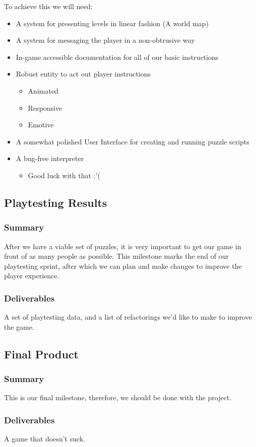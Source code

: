 To achieve this we will need:
\begin{itemize}
  \item A system for presenting levels in linear fashion (A world map)
  \item A system for messaging the player in a non-obtrusive way
  \item In-game accessible documentation for all of our basic instructions
  \item Robust entity to act out player instructions
  \begin{itemize}
    \item Animated
    \item Responsive
    \item Emotive
  \end{itemize}
  \item A somewhat polished User Interface for creating and running puzzle scripts
  \item A bug-free interpreter
  \begin{itemize}
    \item Good luck with that :’(
  \end{itemize}
\end{itemize}

\subsection{Playtesting Results}
\subsubsection*{Summary}
After we have a viable set of puzzles, it is very important to get our game in
front of as many people as possible. This milestone marks the end of our
playtesting sprint, after which we can plan and make changes to improve the
player experience.
\subsubsection*{Deliverables}
A set of playtesting data, and a list of refactorings we’d like to make to
improve the game.

\subsection{Final Product}
\subsubsection*{Summary}
This is our final milestone, therefore, we should be done with the project.
\subsubsection*{Deliverables}
A game that doesn’t suck.
